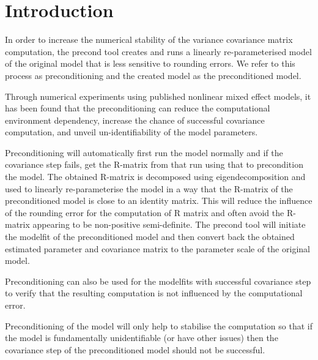 
\usepackage{color}
\usepackage{amsmath}
\usepackage{tikz}
\usetikzlibrary{shapes,arrows}




\maketitle

\section{Introduction}

In order to increase the numerical stability of the variance covariance matrix computation, the precond tool creates and runs a linearly re-parameterised model of the original model that is less sensitive to rounding errors.  We refer to this process as preconditioning and the created model as the preconditioned model. 

Through numerical experiments \cite{Aoki} using published nonlinear mixed effect models, it has been found that the preconditioning can reduce the computational environment dependency, increase the chance of successful covariance computation, and unveil un-identifiability of the model parameters.

Preconditioning will automatically first run the model normally and if the covariance step fails, get the R-matrix from that run using that to precondition the model. The obtained R-matrix is decomposed using eigendecomposition and used to linearly re-parameterise the model in a way that the R-matrix of the preconditioned model is close to an identity matrix.  This will reduce the influence of the rounding error for the computation of R matrix and often avoid the R-matrix appearing to be non-positive semi-definite.  The precond tool will initiate the modelfit of the preconditioned model and then convert back the obtained estimated parameter and covariance matrix to the parameter scale of the original model.

Preconditioning can also be used for the modelfits with successful covariance step to verify that the resulting computation is not influenced by the computational error.

Preconditioning of the model will only help to stabilise the computation so that if the model is fundamentally unidentifiable (or have other issues) then the covariance step of the preconditioned model should not be successful.

